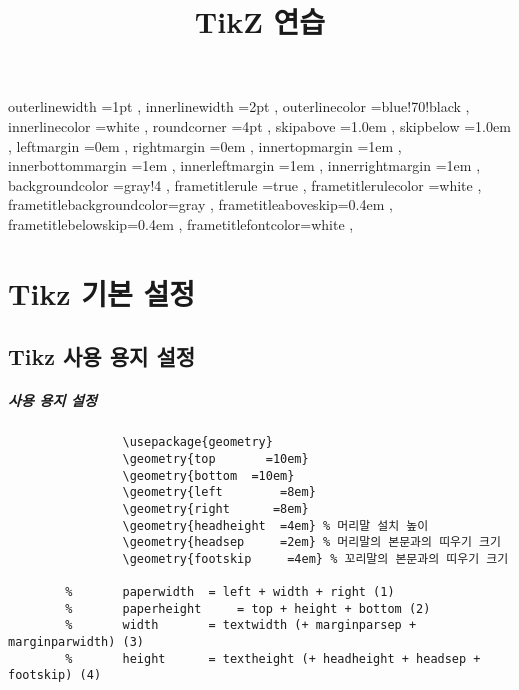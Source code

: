\documentclass[12pt, a4paper, oneside]{book}
\let\stdsection\section
\renewcommand\section{\newpage\stdsection}
\begin{document}
	
			\dominitoc
			\doparttoc			




			\title{TikZ 연습}
			\maketitle


			\tableofcontents 		%
			\cleardoublepage
			\listoftables 			%



		 {
						outerlinewidth		=1pt			,%
						innerlinewidth		=2pt			,%
						outerlinecolor		=blue!70!black	,%
						innerlinecolor		=white 			,%
						roundcorner			=4pt			,%
						skipabove			=1.0em 			,%
						skipbelow			=1.0em 			,%
						leftmargin			=0em			,%
						rightmargin			=0em			,%
						innertopmargin		=1em 			,%
						innerbottommargin 	=1em 			,%
						innerleftmargin		=1em 			,%
						innerrightmargin	=1em 			,%
						backgroundcolor		=gray!4			,%
						frametitlerule		=true 			,%
						frametitlerulecolor	=white			,%
						frametitlebackgroundcolor=gray		,%
						frametitleaboveskip=0.4em 			,%
						frametitlebelowskip=0.4em 			,%
						frametitlefontcolor=white 			,%
						}



	\chapter{Tikz 기본 설정}
	\minitoc				%


	\section{Tikz 사용 용지 설정}

		\paragraph{사용 용지 설정}

			\begin{small}
			\begin{verbatim}
				\usepackage{geometry}
				\geometry{top       =10em}
				\geometry{bottom  =10em}
				\geometry{left        =8em}
				\geometry{right      =8em}
				\geometry{headheight  =4em} % 머리말 설치 높이
				\geometry{headsep     =2em} % 머리말의 본문과의 띠우기 크기
				\geometry{footskip     =4em} % 꼬리말의 본문과의 띠우기 크기
				
		%		paperwidth 	= left + width + right (1)
		%		paperheight 	= top + height + bottom (2)
		%		width 		= textwidth (+ marginparsep + marginparwidth) (3)
		%		height 		= textheight (+ headheight + headsep + footskip) (4)
			\end{verbatim}
			\end{small}
	
\end{document}
